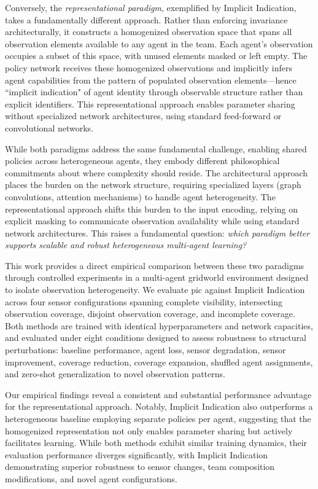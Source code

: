 Conversely, the \emph{representational paradigm}, exemplified by Implicit Indication,%
takes a fundamentally different approach. Rather than enforcing invariance architecturally, 
it constructs a homogenized observation space that spans all observation elements available 
to any agent in the team. Each agent's observation occupies a subset of this space, 
with unused elements masked or left empty. The policy network receives these homogenized 
observations and implicitly infers agent capabilities from the pattern of populated 
observation elements—hence ``implicit indication" of agent identity through observable 
structure rather than explicit identifiers. 
This representational approach enables parameter sharing without specialized 
network architectures, using standard feed-forward or convolutional networks.

While both paradigms address the same fundamental challenge, 
enabling shared policies across heterogeneous agents, 
they embody different philosophical commitments about 
where complexity should reside. 
The architectural approach places the burden on the network structure, 
requiring specialized layers (graph convolutions, attention mechanisms) 
to handle agent heterogeneity. 
The representational approach shifts this burden to the input encoding, 
relying on explicit masking to communicate observation availability 
while using standard network architectures. 
This raises a fundamental question: \textit{which paradigm better 
supports scalable and robust heterogeneous multi-agent learning?}

This work provides a direct empirical comparison between these two paradigms 
through controlled experiments in a multi-agent gridworld environment designed 
to isolate observation heterogeneity. 
We evaluate \gls{pic} against Implicit Indication across four sensor configurations 
spanning complete visibility, intersecting observation coverage, disjoint observation coverage, 
and incomplete coverage. 
Both methods are trained with identical hyperparameters and network capacities, 
and evaluated under eight conditions designed to assess robustness to structural perturbations: 
baseline performance, agent loss, sensor degradation, sensor improvement, coverage reduction, 
coverage expansion, shuffled agent assignments, 
and zero-shot generalization to novel observation patterns.

Our empirical findings reveal a consistent and substantial performance advantage for 
the representational approach. 
Notably, Implicit Indication also outperforms a heterogeneous baseline employing 
separate policies per agent, suggesting that the homogenized representation not 
only enables parameter sharing but actively facilitates learning. 
While both methods exhibit similar training dynamics, 
their evaluation performance diverges significantly, 
with Implicit Indication demonstrating superior robustness to sensor changes, 
team composition modifications, and novel agent configurations.

